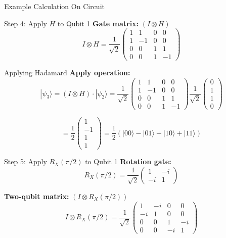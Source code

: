 \documentclass{beamer}
\begin{document}
\begin{frame}{Example Calculation On Circuit}
    \begin{block}{Step 4: Apply $H$ to Qubit 1}
        \textbf{Gate matrix:} $(I \otimes H)$
        \[
        I \otimes H = \frac{1}{\sqrt{2}} \begin{pmatrix} 
        1 & 1 & 0 & 0 \\ 
        1 & -1 & 0 & 0 \\ 
        0 & 0 & 1 & 1 \\ 
        0 & 0 & 1 & -1 
        \end{pmatrix}
        \]
    \end{block}
    \begin{block}{Applying Hadamard}
        \textbf{Apply operation:}
        \[
        |\psi_3\rangle = (I \otimes H) \cdot |\psi_2\rangle = \frac{1}{\sqrt{2}} \begin{pmatrix} 
        1 & 1 & 0 & 0 \\ 
        1 & -1 & 0 & 0 \\ 
        0 & 0 & 1 & 1 \\ 
        0 & 0 & 1 & -1 
        \end{pmatrix} \frac{1}{\sqrt{2}} \begin{pmatrix} 0 \\ 1 \\ 1 \\ 0 \end{pmatrix}
        \]
        
        \[
        = \frac{1}{2} \begin{pmatrix} 1 \\ -1 \\ 1 \\ 1 \end{pmatrix} = \frac{1}{2}(|00\rangle - |01\rangle + |10\rangle + |11\rangle)
        \]
    \end{block}
    
    \framebreak
    
    \begin{block}{Step 5: Apply $R_X(\pi/2)$ to Qubit 1}
        \textbf{Rotation gate:}
        \[
        R_X(\pi/2) = \frac{1}{\sqrt{2}} \begin{pmatrix} 1 & -i \\ -i & 1 \end{pmatrix}
        \]
        
        \textbf{Two-qubit matrix:} $(I \otimes R_X(\pi/2))$
        \[
        I \otimes R_X(\pi/2) = \frac{1}{\sqrt{2}} \begin{pmatrix} 
        1 & -i & 0 & 0 \\ 
        -i & 1 & 0 & 0 \\ 
        0 & 0 & 1 & -i \\ 
        0 & 0 & -i & 1 
        \end{pmatrix}
        \]
        

\end{block}
\end{frame}
\end{document}
